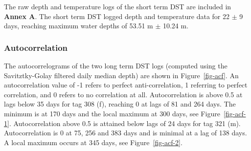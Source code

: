\documentclass[
  authoryear,
  review,
  3p]{elsarticle}
\begin{document}
The raw depth and temperature logs of the short term DST are included in
\textbf{Annex A}. The short term DST logged depth and temperature data
for 22 \(\pm\) 9 days, reaching maximum water depths of 53.51 m \(\pm\)
10.24 m.

\hypertarget{sec-resacf}{%
\subsubsection{Autocorrelation}\label{sec-resacf}}

The autocorrelograms of the two long term DST logs (computed using the
Savitztky-Golay filtered daily median depth) are shown in
Figure~\ref{fig-acf}. An autocorrelation value of -1 refers to perfect
anti-correlation, 1 referring to perfect correlation, and 0 refers to no
correlation at all. Autocorrelation is above 0.5 at lags below 35 days
for tag 308 (f), reaching 0 at lags of 81 and 264 days. The minimum is
at 170 days and the local maximum at 300 days, see
Figure~\ref{fig-acf-1}. Autocorrelation above 0.5 is attained below lags
of 24 days for tag 321 (m). Autocorrelation is 0 at 75, 256 and 383 days
and is minimal at a lag of 138 days. A local maximum occurs at 345 days,
see Figure~\ref{fig-acf-2}.
\end{document}
